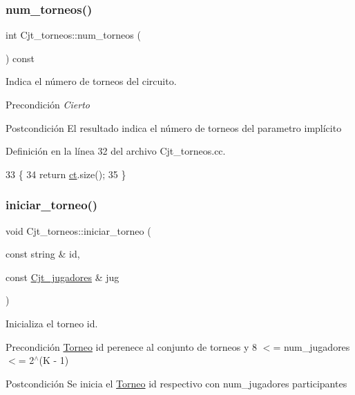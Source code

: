 \subsubsection{\texorpdfstring{num\+\_\+torneos()}{num\_torneos()}}
{\footnotesize\ttfamily int Cjt\+\_\+torneos\+::num\+\_\+torneos (\begin{DoxyParamCaption}{ }\end{DoxyParamCaption}) const}



Indica el número de torneos del circuito. 

\begin{DoxyPrecond}{Precondición}
{\itshape Cierto} 
\end{DoxyPrecond}
\begin{DoxyPostcond}{Postcondición}
El resultado indica el número de torneos del parametro implícito 
\end{DoxyPostcond}


Definición en la línea 32 del archivo Cjt\+\_\+torneos.\+cc.


\begin{DoxyCode}
33 \{
34     \textcolor{keywordflow}{return} \hyperlink{class_cjt__torneos_a701df4fc4fbd2d6ffa081a01845083f3}{ct}.size();
35 \}
\end{DoxyCode}
\mbox{\label{class_cjt__torneos_aa6ca6587e715b38907a0af67f0e13da4}} 
\subsubsection{\texorpdfstring{iniciar\+\_\+torneo()}{iniciar\_torneo()}}
{\footnotesize\ttfamily void Cjt\+\_\+torneos\+::iniciar\+\_\+torneo (\begin{DoxyParamCaption}\item[{const string \&}]{id,  }\item[{const \hyperlink{class_cjt__jugadores}{Cjt\+\_\+jugadores} \&}]{jug }\end{DoxyParamCaption})}



Inicializa el torneo id. 

\begin{DoxyPrecond}{Precondición}
\hyperlink{class_torneo}{Torneo} id perenece al conjunto de torneos y 8 $<$= num\+\_\+jugadores $<$= 2$^\wedge$(K -\/ 1) 
\end{DoxyPrecond}
\begin{DoxyPostcond}{Postcondición}
Se inicia el \hyperlink{class_torneo}{Torneo} id respectivo con num\+\_\+jugadores participantes 
\end{DoxyPostcond}


